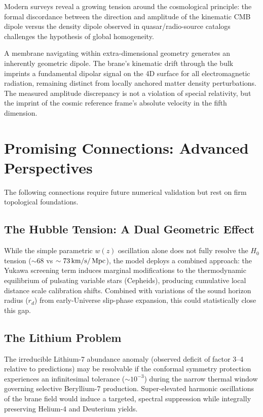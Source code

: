 Modern surveys reveal a growing tension around the cosmological principle: the formal discordance between the direction and amplitude of the kinematic CMB dipole versus the density dipole observed in quasar/radio-source catalogs challenges the hypothesis of global homogeneity.

A membrane navigating within extra-dimensional geometry generates an inherently geometric dipole. The brane's kinematic drift through the \AdS{} bulk imprints a fundamental dipolar signal on the 4D surface for all electromagnetic radiation, remaining distinct from locally anchored matter density perturbations. The measured amplitude discrepancy is not a violation of special relativity, but the imprint of the cosmic reference frame's absolute velocity in the fifth dimension.

\section{Promising Connections: Advanced Perspectives}
\label{sec:promising}

The following connections require future numerical validation but rest on firm topological foundations.

\subsection{The Hubble Tension: A Dual Geometric Effect}
\label{sec:hubble_tension}

While the simple parametric $w(z)$ oscillation alone does not fully resolve the $H_0$ tension ($\sim 68$ vs $\sim 73\,\text{km/s}/\,\text{Mpc}$), the model deploys a combined approach: the Yukawa screening term induces marginal modifications to the thermodynamic equilibrium of pulsating variable stars (Cepheids), producing cumulative local distance scale calibration shifts. Combined with variations of the sound horizon radius ($r_d$) from early-Universe slip-phase expansion, this could statistically close this gap.

\subsection{The Lithium Problem}
\label{sec:lithium}

The irreducible Lithium-7 abundance anomaly (observed deficit of factor 3--4 relative to \LCDM{} predictions) may be resolvable if the conformal symmetry protection experiences an infinitesimal tolerance ($\sim 10^{-3}$) during the narrow thermal window governing selective Beryllium-7 production. Super-elevated harmonic oscillations of the brane field would induce a targeted, spectral suppression while integrally preserving Helium-4 and Deuterium yields.

